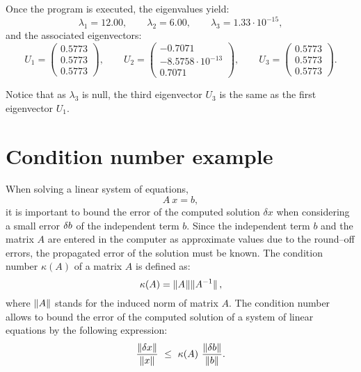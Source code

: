     Once the program is executed,  the eigenvalues yield:
            \begin{equation*}
            	\lambda_1 = 12.00, \qquad \lambda_2 = 6.00, \qquad \lambda_3 =  1.33\cdot 10^{-15}, 
            \end{equation*}
    and the associated eigenvectors:
    \begin{equation*}
    	U_1 = \begin{pmatrix}
    		 0.5773 \\
    		 0.5773 \\
    		 0.5773
    	\end{pmatrix} , \qquad
        U_2 = \begin{pmatrix}
            	-0.7071 \\
            	-8.5758 \cdot 10^{-13}\\
    	        0.7071
        \end{pmatrix} , \qquad 
         U_3 = \begin{pmatrix}
         0.5773 \\
         0.5773 \\
         0.5773
         \end{pmatrix}.
    \end{equation*}

    Notice that as $\lambda_3$ is null, the third eigenvector $U_3$ is the same as the first eigenvector $U_1$.
 

\newpage
\section{Condition number example} 
When solving a linear system of equations, 
\begin{equation*}
	A \ x = b,
\end{equation*}
it is important to bound the error of the computed solution $ \delta x $ when 
considering a small error $ \var b $ of the independent term $ b $. 
Since the independent term $ b $ and the  matrix $ A $ are entered in the computer as approximate values due to the round--off errors, 
the propagated error of the solution must be known.
The condition number $\kappa(A)$ of a matrix $ A $ is defined as: 
\begin{equation*}
\kappa(A) = \norm{A^{\mbox{}}}\norm*{A^{-1}}, 
\end{equation*}
where $ \norm{A} $ stands for the induced norm of matrix $ A $. 
The condition number allows to bound the error of the computed solution of a system of linear equations by the following expression: 
\begin{equation*}
\frac{\norm{\var x}}{\norm{ x}} \ \leq  \  \kappa(A)  \   \frac{\norm{\var 
b}}{\norm{ b}}.
\end{equation*}



